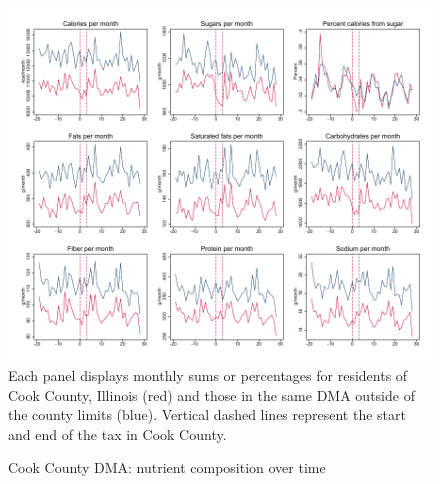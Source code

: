 \documentclass[12pt]{article}
\begin{document}
\clearpage
\begin{figure}[t]
\begin{center}
\caption{Cook County DMA: nutrient composition over time}
\label{cook_panelist_nutr}
\includegraphics[width=1\textwidth, angle=0]{../figures/panelist_nutr.pdf}
\footnotesize Each panel displays monthly sums or percentages for residents of Cook County, Illinois (red) and those in the same DMA outside of the county limits (blue). Vertical dashed lines represent the start and end of the tax in Cook County.
\end{center}
\end{figure}
\end{document}
